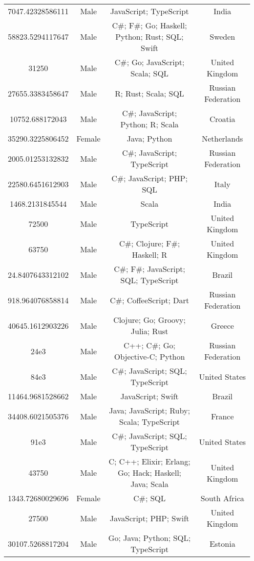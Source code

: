 \begin{center}
\begin{tabular}{ |c|c|c|c| }
7047.42328586111  &  Male  &  JavaScript; TypeScript  &  India  \\ 
58823.5294117647  &  Male  &  C\#; F\#; Go; Haskell; Python; Rust; SQL; Swift  &  Sweden  \\ 
31250  &  Male  &  C\#; Go; JavaScript; Scala; SQL  &  United Kingdom  \\ 
27655.3383458647  &  Male  &  R; Rust; Scala; SQL  &  Russian Federation  \\ 
10752.688172043  &  Male  &  C\#; JavaScript; Python; R; Scala  &  Croatia  \\ 
35290.3225806452  &  Female  &  Java; Python  &  Netherlands  \\ 
2005.01253132832  &  Male  &  C\#; JavaScript; TypeScript  &  Russian Federation  \\ 
22580.6451612903  &  Male  &  C\#; JavaScript; PHP; SQL  &  Italy  \\ 
1468.2131845544  &  Male  &  Scala  &  India  \\ 
72500  &  Male  &  TypeScript  &  United Kingdom  \\ 
63750  &  Male  &  C\#; Clojure; F\#; Haskell; R  &  United Kingdom  \\ 
24.8407643312102  &  Male  &  C\#; F\#; JavaScript; SQL; TypeScript  &  Brazil  \\ 
918.964076858814  &  Male  &  C\#; CoffeeScript; Dart  &  Russian Federation  \\ 
40645.1612903226  &  Male  &  Clojure; Go; Groovy; Julia; Rust  &  Greece  \\ 
24e3  &  Male  &  C++; C\#; Go; Objective-C; Python  &  Russian Federation  \\ 
84e3  &  Male  &  C\#; JavaScript; SQL; TypeScript  &  United States  \\ 
11464.9681528662  &  Male  &  JavaScript; Swift  &  Brazil  \\ 
34408.6021505376  &  Male  &  Java; JavaScript; Ruby; Scala; TypeScript  &  France  \\ 
91e3  &  Male  &  C\#; JavaScript; SQL; TypeScript  &  United States  \\ 
43750  &  Male  &  C; C++; Elixir; Erlang; Go; Hack; Haskell; Java; Scala  &  United Kingdom  \\ 
1343.72680029696  &  Female  &  C\#; SQL  &  South Africa  \\ 
27500  &  Male  &  JavaScript; PHP; Swift  &  United Kingdom  \\ 
30107.5268817204  &  Male  &  Go; Java; Python; SQL; TypeScript  &  Estonia  \\ 

\end{tabular}
\end{center}
